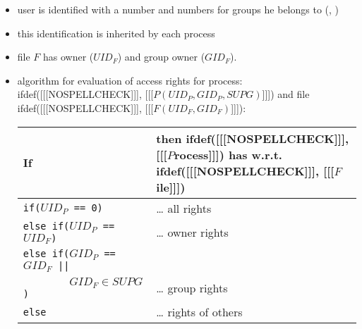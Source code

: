 \begin{slide}
\setlength{\baselineskip}{0.9\baselineskip}
\begin{itemize}
\item user is identified with a  number and numbers for groups he
belongs to (, )
\item this identification is inherited by each process
\item file $F$ has owner ($UID_F$) and group owner ($GID_F$). 
\item algorithm for evaluation of access rights for process:
ifdef([[[NOSPELLCHECK]]], [[[$P(UID_P,GID_P,SUPG)$]]]) and file
ifdef([[[NOSPELLCHECK]]], [[[$F(UID_F,GID_F)$]]]):
\begin{tabular}{ll}
If & then ifdef([[[NOSPELLCHECK]]], [[[$P$rocess]]]) has w.r.t.
ifdef([[[NOSPELLCHECK]]], [[[$F$ile]]]) \\ 
\hline
\texttt{if($UID_P$ == 0)} & \dots{} all rights \\
\texttt{else if($UID_P$ == $UID_F$)} & \dots{} owner rights \\
\texttt{else if($GID_P$ == $GID_F$ ||} &\\
\texttt{~~~~~~~~$GID_F \in SUPG$)} & \dots{} group rights \\
\texttt{else} & \dots{} rights of others
\end{tabular}
\end{itemize}
\end{slide}

